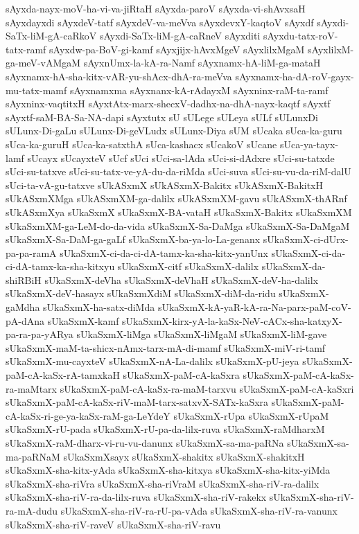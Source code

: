 {sAyxda-nayx-moV-ha-vi-va-jiRtaH
sAyxda-paroV
sAyxda-vi-shAvxsaH
sAyxdayxdi
sAyxdeV-tatf
sAyxdeV-va-meVva
sAyxdevxY-kaqtoV
sAyxdf
sAyxdi-SaTx-liM-gA-caRkoV
sAyxdi-SaTx-liM-gA-caRneV
sAyxditi
sAyxdu-tatx-roV-tatx-ramf
sAyxdw-pa-BoV-gi-kamf
sAyxjijx-hAvxMgeV
sAyxlilxMgaM
sAyxlilxM-ga-meV-vAMgaM
sAyxnUmx-la-kA-ra-Namf
sAyxnamx-hA-liM-ga-mataH
sAyxnamx-hA-sha-kitx-vAR-yu-shAcx-dhA-ra-meVva
sAyxnamx-ha-dA-roV-gayx-mu-tatx-mamf
sAyxnamxma
sAyxnanx-kA-rAdayxM
sAyxninx-raM-ta-ramf
sAyxninx-vaqtitxH
sAyxtAtx-marx-shecxV-dadhx-na-dhA-nayx-kaqtf
sAyxtf
sAyxtf-saM-BA-Sa-NA-dapi
sAyxtutx
sU
sULege
sULeya
sULf
sULunxDi
sULunx-Di-gaLu
sULunx-Di-geVLudx
sULunx-Diya
sUM
sUcaka
sUca-ka-guru
sUca-ka-guruH
sUca-ka-satxthA
sUca-kashacx
sUcakoV
sUcane
sUca-ya-tayx-lamf
sUcayx
sUcayxteV
sUcf
sUci
sUci-sa-lAda
sUci-si-dAdxre
sUci-su-tatxde
sUci-su-tatxve
sUci-su-tatx-ve-yA-du-da-riMda
sUci-suva
sUci-su-vu-da-riM-dalU
sUci-ta-vA-gu-tatxve
sUkASxmX
sUkASxmX-Bakitx
sUkASxmX-BakitxH
sUkASxmXMga
sUkASxmXM-ga-dalilx
sUkASxmXM-gavu
sUkASxmX-thARnf
sUkASxmXya
sUkaSxmX
sUkaSxmX-BA-vataH
sUkaSxmX-Bakitx
sUkaSxmXM
sUkaSxmXM-ga-LeM-do-da-vida
sUkaSxmX-Sa-DaMga
sUkaSxmX-Sa-DaMgaM
sUkaSxmX-Sa-DaM-ga-gaLf
sUkaSxmX-ba-ya-lo-La-genanx
sUkaSxmX-ci-dUrx-pa-pa-ramA
sUkaSxmX-ci-da-ci-dA-tamx-ka-sha-kitx-yanUnx
sUkaSxmX-ci-da-ci-dA-tamx-ka-sha-kitxyu
sUkaSxmX-citf
sUkaSxmX-dalilx
sUkaSxmX-da-shiRBiH
sUkaSxmX-deVha
sUkaSxmX-deVhaH
sUkaSxmX-deV-ha-dalilx
sUkaSxmX-deV-hasayx
sUkaSxmXdiM
sUkaSxmX-diM-da-ridu
sUkaSxmX-gaMdha
sUkaSxmX-ha-satx-diMda
sUkaSxmX-kA-yaR-kA-ra-Na-parx-paM-coV-pA-dAna
sUkaSxmX-kamf
sUkaSxmX-kirx-yA-la-kaSx-NeV-cACx-sha-katxyX-pa-ra-pa-yARya
sUkaSxmX-liMga
sUkaSxmX-liMgaM
sUkaSxmX-liM-gave
sUkaSxmX-maM-ta-shicx-nAmx-tarx-mA-di-mamf
sUkaSxmX-miV-ri-tamf
sUkaSxmX-mu-cayxteV
sUkaSxmX-nA-La-dalilx
sUkaSxmX-pU-jeya
sUkaSxmX-paM-cA-kaSx-rA-tamxkaH
sUkaSxmX-paM-cA-kaSxra
sUkaSxmX-paM-cA-kaSx-ra-maMtarx
sUkaSxmX-paM-cA-kaSx-ra-maM-tarxvu
sUkaSxmX-paM-cA-kaSxri
sUkaSxmX-paM-cA-kaSx-riV-maM-tarx-satxvX-SATx-kaSxra
sUkaSxmX-paM-cA-kaSx-ri-ge-ya-kaSx-raM-ga-LeYdeY
sUkaSxmX-rUpa
sUkaSxmX-rUpaM
sUkaSxmX-rU-pada
sUkaSxmX-rU-pa-da-lilx-ruva
sUkaSxmX-raMdharxM
sUkaSxmX-raM-dharx-vi-ru-vu-danunx
sUkaSxmX-sa-ma-paRNa
sUkaSxmX-sa-ma-paRNaM
sUkaSxmXsayx
sUkaSxmX-shakitx
sUkaSxmX-shakitxH
sUkaSxmX-sha-kitx-yAda
sUkaSxmX-sha-kitxya
sUkaSxmX-sha-kitx-yiMda
sUkaSxmX-sha-riVra
sUkaSxmX-sha-riVraM
sUkaSxmX-sha-riV-ra-dalilx
sUkaSxmX-sha-riV-ra-da-lilx-ruva
sUkaSxmX-sha-riV-rakekx
sUkaSxmX-sha-riV-ra-mA-dudu
sUkaSxmX-sha-riV-ra-rU-pa-vAda
sUkaSxmX-sha-riV-ra-vanunx
sUkaSxmX-sha-riV-raveV
sUkaSxmX-sha-riV-ravu
}
